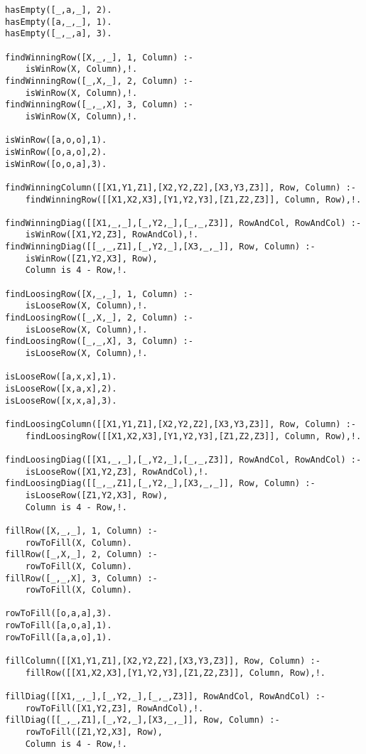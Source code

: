 \documentclass{article}
\begin{document}
\begin{lstlisting}
hasEmpty([_,a,_], 2).
hasEmpty([a,_,_], 1).
hasEmpty([_,_,a], 3).

findWinningRow([X,_,_], 1, Column) :-
    isWinRow(X, Column),!.
findWinningRow([_,X,_], 2, Column) :-
    isWinRow(X, Column),!.
findWinningRow([_,_,X], 3, Column) :-
    isWinRow(X, Column),!.

isWinRow([a,o,o],1).
isWinRow([o,a,o],2).
isWinRow([o,o,a],3).

findWinningColumn([[X1,Y1,Z1],[X2,Y2,Z2],[X3,Y3,Z3]], Row, Column) :-
    findWinningRow([[X1,X2,X3],[Y1,Y2,Y3],[Z1,Z2,Z3]], Column, Row),!.

findWinningDiag([[X1,_,_],[_,Y2,_],[_,_,Z3]], RowAndCol, RowAndCol) :-
    isWinRow([X1,Y2,Z3], RowAndCol),!.
findWinningDiag([[_,_,Z1],[_,Y2,_],[X3,_,_]], Row, Column) :-
    isWinRow([Z1,Y2,X3], Row),
    Column is 4 - Row,!.

findLoosingRow([X,_,_], 1, Column) :-
    isLooseRow(X, Column),!.
findLoosingRow([_,X,_], 2, Column) :-
    isLooseRow(X, Column),!.
findLoosingRow([_,_,X], 3, Column) :-
    isLooseRow(X, Column),!.

isLooseRow([a,x,x],1).
isLooseRow([x,a,x],2).
isLooseRow([x,x,a],3).

findLoosingColumn([[X1,Y1,Z1],[X2,Y2,Z2],[X3,Y3,Z3]], Row, Column) :-
    findLoosingRow([[X1,X2,X3],[Y1,Y2,Y3],[Z1,Z2,Z3]], Column, Row),!.

findLoosingDiag([[X1,_,_],[_,Y2,_],[_,_,Z3]], RowAndCol, RowAndCol) :-
    isLooseRow([X1,Y2,Z3], RowAndCol),!.
findLoosingDiag([[_,_,Z1],[_,Y2,_],[X3,_,_]], Row, Column) :-
    isLooseRow([Z1,Y2,X3], Row),
    Column is 4 - Row,!.

fillRow([X,_,_], 1, Column) :-
    rowToFill(X, Column).
fillRow([_,X,_], 2, Column) :-
    rowToFill(X, Column).
fillRow([_,_,X], 3, Column) :-
    rowToFill(X, Column).

rowToFill([o,a,a],3).
rowToFill([a,o,a],1).
rowToFill([a,a,o],1).

fillColumn([[X1,Y1,Z1],[X2,Y2,Z2],[X3,Y3,Z3]], Row, Column) :-
    fillRow([[X1,X2,X3],[Y1,Y2,Y3],[Z1,Z2,Z3]], Column, Row),!.

fillDiag([[X1,_,_],[_,Y2,_],[_,_,Z3]], RowAndCol, RowAndCol) :-
    rowToFill([X1,Y2,Z3], RowAndCol),!.
fillDiag([[_,_,Z1],[_,Y2,_],[X3,_,_]], Row, Column) :-
    rowToFill([Z1,Y2,X3], Row),
    Column is 4 - Row,!.
  \end{lstlisting}
\end{document}
